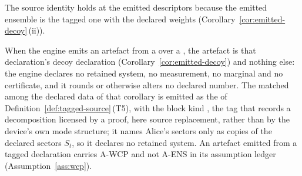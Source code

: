 
The source identity holds at the emitted descriptors because the emitted
ensemble is the tagged one with the declared weights
(Corollary~\ref{cor:emitted-decoy}\,(ii)).

\begin{requirement}\label{req:decoy-emission}
When the engine emits an artefact from a  over
a , the artefact is that declaration's decoy
declaration (Corollary~\ref{cor:emitted-decoy}) and nothing else: the engine
declares no retained system, no measurement, no marginal and no certificate,
and it rounds or otherwise alters no declared number. The matched
 among the declared data of that corollary is emitted as
the  of
Definition~\ref{def:tagged-source}\,(T5), with
the block kind , the tag that records a decomposition
licensed by a proof, here source replacement, rather than by the device's own
mode structure;
it names Alice's sectors only as copies of the declared sectors $S_t$, so it
declares no retained system. An artefact emitted from a tagged declaration
carries A-WCP and not A-ENS in its assumption ledger
(Assumption~\ref{ass:wcp}).
\end{requirement}

